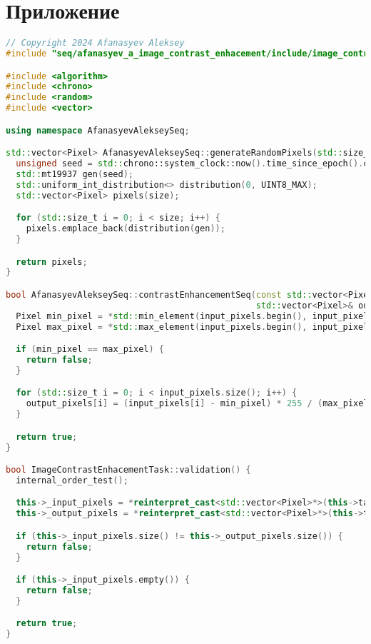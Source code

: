 \documentclass{report}
\begin{document}
\newpage

\section*{Приложение}

\begin{lstlisting}[language=C++,caption=Последовательная версия]
// Copyright 2024 Afanasyev Aleksey
#include "seq/afanasyev_a_image_contrast_enhacement/include/image_contrast_enhacement_task.hpp"

#include <algorithm>
#include <chrono>
#include <random>
#include <vector>

using namespace AfanasyevAlekseySeq;

std::vector<Pixel> AfanasyevAlekseySeq::generateRandomPixels(std::size_t size) {
  unsigned seed = std::chrono::system_clock::now().time_since_epoch().count();
  std::mt19937 gen(seed);
  std::uniform_int_distribution<> distribution(0, UINT8_MAX);
  std::vector<Pixel> pixels(size);

  for (std::size_t i = 0; i < size; i++) {
    pixels.emplace_back(distribution(gen));
  }

  return pixels;
}

bool AfanasyevAlekseySeq::contrastEnhancementSeq(const std::vector<Pixel>& input_pixels,
                                                 std::vector<Pixel>& output_pixels) {
  Pixel min_pixel = *std::min_element(input_pixels.begin(), input_pixels.end());
  Pixel max_pixel = *std::max_element(input_pixels.begin(), input_pixels.end());

  if (min_pixel == max_pixel) {
    return false;
  }

  for (std::size_t i = 0; i < input_pixels.size(); i++) {
    output_pixels[i] = (input_pixels[i] - min_pixel) * 255 / (max_pixel - min_pixel);
  }

  return true;
}

bool ImageContrastEnhacementTask::validation() {
  internal_order_test();

  this->_input_pixels = *reinterpret_cast<std::vector<Pixel>*>(this->taskData->inputs[0]);
  this->_output_pixels = *reinterpret_cast<std::vector<Pixel>*>(this->taskData->outputs[0]);

  if (this->_input_pixels.size() != this->_output_pixels.size()) {
    return false;
  }

  if (this->_input_pixels.empty()) {
    return false;
  }

  return true;
}


\end{lstlisting}
\end{document}
